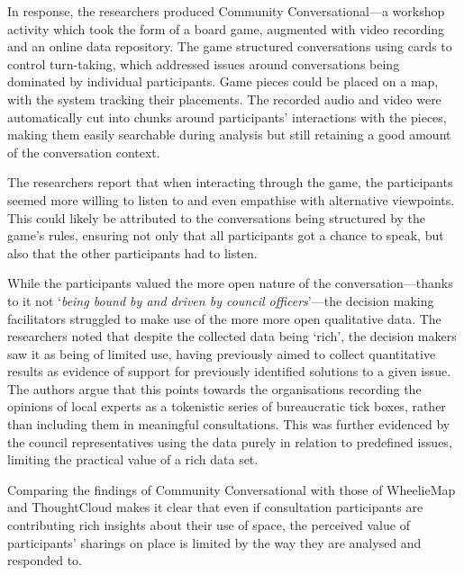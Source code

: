 In response, the researchers produced Community Conversational---a workshop activity which took the form of a board game, augmented with video recording and an online data repository. The game structured conversations using cards to control turn-taking, which addressed issues around conversations being dominated by individual participants. Game pieces could be placed on a map, with the system tracking their placements. The recorded audio and video were automatically cut into chunks around participants' interactions with the pieces, making them easily searchable during analysis but still retaining a good amount of the conversation context.

The researchers report that when interacting through the game, the participants seemed more willing to listen to and even empathise with alternative viewpoints. This could likely be attributed to the conversations being structured by the game's rules, ensuring not only that all participants got a chance to speak, but also that the other participants had to listen.

While the participants valued the more open nature of the conversation---thanks to it not `\textit{being bound by and driven by council officers}'---the decision making facilitators struggled to make use of the more more open qualitative data. The researchers noted that despite the collected data being `rich', the decision makers saw it as being of limited use, having previously aimed to collect quantitative results as evidence of support for previously identified solutions to a given issue. The authors argue that this points towards the organisations recording the opinions of local experts as a tokenistic series of bureaucratic tick boxes, rather than including them in meaningful consultations. This was further evidenced by the council representatives using the data purely in relation to predefined issues, limiting the practical value of a rich data set. 

Comparing the findings of Community Conversational with those of WheelieMap and ThoughtCloud makes it clear that even if consultation participants are contributing rich insights about their use of space, the perceived value of participants' sharings on place is limited by the way they are analysed and responded to.

